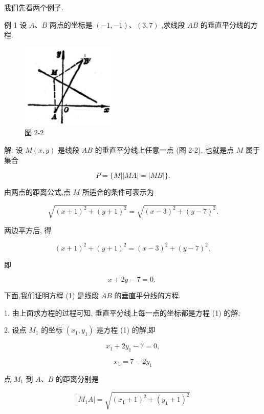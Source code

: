 \documentclass[lang=cn,newtx,10.5pt,scheme=chinese]{elegantbook}
\begin{document}
我们先看两个例子.

例 1 设 \(A\text{、}B\) 两点的坐标是 \(\left( {-1, - 1}\right) \text{、}\left( {3,7}\right)\) ,求线段 \({AB}\) 的垂直平分线的方程.

\begin{figure}[h]
  \centering
  \includegraphics[max width=0.4\textwidth]{images/01912cc2-ffb6-728e-9ae7-b113ff05c64b_67_837628.jpg}
  \caption{图 2-2}
\end{figure}



解: 设 \(M\left( {x,y}\right)\) 是线段 \({AB}\) 的垂直平分线上任意一点 (图 2-2), 也就是点 \(M\) 属于集合

\[
  P = \{ M\left| \right| {MA}\left| = \right| {MB} \mid \} .
\]

由两点的距离公式,点 \(M\) 所适合的条件可表示为

\[
  \sqrt{{\left( x + 1\right) }^{2} + {\left( y + 1\right) }^{2}} = \sqrt{{\left( x - 3\right) }^{2} + {\left( y - 7\right) }^{2}}.
\]

两边平方后, 得

\[
    {\left( x + 1\right) }^{2} + {\left( y + 1\right) }^{2} = {\left( x - 3\right) }^{2} + {\left( y - 7\right) }^{2},
\]

即

\[
  x + {2y} - 7 = 0\text{. } \tag{1}
\]

下面,我们证明方程 (1) 是线段 \({AB}\) 的垂直平分线的方程.

1. 由上面求方程的过程可知, 垂直平分线上每一点的坐标都是方程 (1) 的解;

2. 设点 \({M}_{1}\) 的坐标 \(\left( {{x}_{1},{y}_{1}}\right)\) 是方程 (1) 的解,即

\[
    {x}_{1} + 2{y}_{1} - 7 = 0,
\]

\[
    {x}_{1} = 7 - 2{y}_{1}
\]

点 \({M}_{1}\) 到 \(A\text{、}B\) 的距离分别是

\[
  \left| {{M}_{1}A}\right| = \sqrt{{\left( {x}_{1} + 1\right) }^{2} + {\left( {y}_{1} + 1\right) }^{2}}
\]
\end{document}
